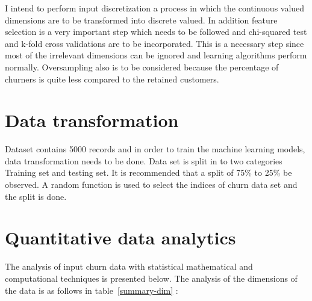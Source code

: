 I intend to perform input discretization a process in which the continuous valued dimensions are to be transformed into discrete valued. 
In addition feature selection is a very important step which needs to be followed and chi-squared test and k-fold cross validations are to be incorporated. This is a necessary step since most of the irrelevant dimensions can be ignored and learning algorithms perform normally.
Oversampling also is to be considered because the percentage of churners is quite less compared to the retained customers.

\section{Data transformation}
Dataset contains 5000 records and in order to train the machine learning models, data transformation needs to be done.
Data set is split in to two categories Training set and testing set. It is recommended that a split of 75\% to 25\% be observed.
A random function is used to select the indices of churn data set and the split is done.


\section{Quantitative data analytics}
The analysis of input churn data with statistical mathematical and computational techniques is presented below.
The analysis of the dimensions of the data is as follows in table~\ref{summary-dim} :

